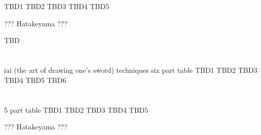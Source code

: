 \documentclass[dvipdfmx, a4paper, 12pt]{utarticle}
\begin{document}
\begin{CJK*}{UTF8}{min}
\begin{landscape}
\section{}
TBD1
TBD2
TBD3
TBD4
TBD5

???
Hatakeyama ???

\newpage
\pagestyle{empty}
TBD
\section{}
iai (the art of drawing one's sword) techniques six part table
TBD1
TBD2
TBD3
TBD4
TBD5
TBD6
\section{}
5 part table
TBD1
TBD2
TBD3
TBD4
TBD5

???
Hatakeyama ???

\end{landscape}
\end{CJK*}
\end{document}
